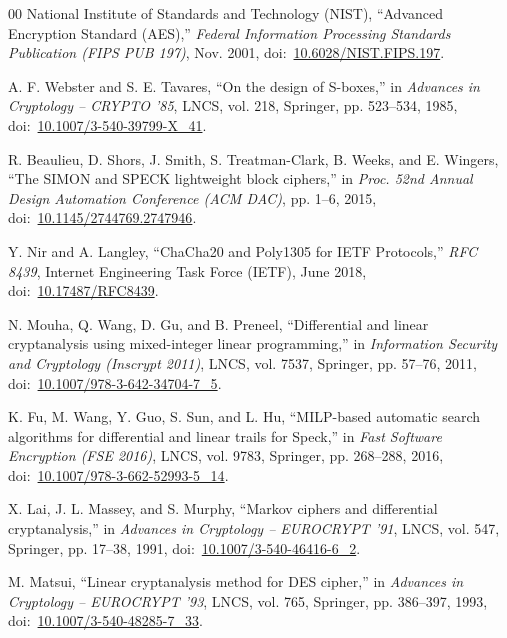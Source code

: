 \documentclass[10pt,twocolumn]{article}
\begin{document}
\begin{thebibliography}{00}
National Institute of Standards and Technology (NIST), ``Advanced Encryption Standard (AES),'' \textit{Federal Information Processing Standards Publication (FIPS PUB 197)}, Nov. 2001, doi:~\href{https://doi.org/10.6028/NIST.FIPS.197}{10.6028/NIST.FIPS.197}.

A. F. Webster and S. E. Tavares, ``On the design of S-boxes,'' in \textit{Advances in Cryptology -- CRYPTO '85}, LNCS, vol. 218, Springer, pp. 523--534, 1985, doi:~\href{https://doi.org/10.1007/3-540-39799-X_41}{10.1007/3-540-39799-X\_41}.

R. Beaulieu, D. Shors, J. Smith, S. Treatman-Clark, B. Weeks, and E. Wingers, ``The SIMON and SPECK lightweight block ciphers,'' in \textit{Proc. 52nd Annual Design Automation Conference (ACM DAC)}, pp. 1--6, 2015, doi:~\href{https://doi.org/10.1145/2744769.2747946}{10.1145/2744769.2747946}.

Y. Nir and A. Langley, ``ChaCha20 and Poly1305 for IETF Protocols,'' \textit{RFC 8439}, Internet Engineering Task Force (IETF), June 2018, doi:~\href{https://doi.org/10.17487/RFC8439}{10.17487/RFC8439}.

N. Mouha, Q. Wang, D. Gu, and B. Preneel, ``Differential and linear cryptanalysis using mixed-integer linear programming,'' in \textit{Information Security and Cryptology (Inscrypt 2011)}, LNCS, vol. 7537, Springer, pp. 57--76, 2011, doi:~\href{https://doi.org/10.1007/978-3-642-34704-7_5}{10.1007/978-3-642-34704-7\_5}.

K. Fu, M. Wang, Y. Guo, S. Sun, and L. Hu, ``MILP-based automatic search algorithms for differential and linear trails for Speck,'' in \textit{Fast Software Encryption (FSE 2016)}, LNCS, vol. 9783, Springer, pp. 268--288, 2016, doi:~\href{https://doi.org/10.1007/978-3-662-52993-5_14}{10.1007/978-3-662-52993-5\_14}.

X. Lai, J. L. Massey, and S. Murphy, ``Markov ciphers and differential cryptanalysis,'' in \textit{Advances in Cryptology -- EUROCRYPT '91}, LNCS, vol. 547, Springer, pp. 17--38, 1991, doi:~\href{https://doi.org/10.1007/3-540-46416-6_2}{10.1007/3-540-46416-6\_2}.

M. Matsui, ``Linear cryptanalysis method for DES cipher,'' in \textit{Advances in Cryptology -- EUROCRYPT '93}, LNCS, vol. 765, Springer, pp. 386--397, 1993, doi:~\href{https://doi.org/10.1007/3-540-48285-7_33}{10.1007/3-540-48285-7\_33}.


\end{thebibliography}
\end{document}
